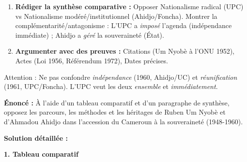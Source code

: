 \documentclass[11pt]{article}
\newcommand{\cle}[1]{{\popxbold\color{popdark}#1}}
\begin{document}
\begin{methode}
\begin{enumerate}
    \item \textbf{Rédiger la synthèse comparative :} Opposer \cle{Nationalisme radical (UPC)} vs \cle{Nationalisme modéré/institutionnel (Ahidjo/Foncha)}. Montrer la complémentarité/antagonisme : L'UPC a \emph{imposé} l'agenda (indépendance immédiate) ; Ahidjo a \emph{géré} la souveraineté (État).
    \item \textbf{Argumenter avec des preuves :} Citations (Um Nyobè à l'ONU 1952), Actes (Loi 1956, Référendum 1972), Dates précises.
\end{enumerate}
\cle{Attention :} Ne pas confondre \textit{indépendance} (1960, Ahidjo/UC) et \textit{réunification} (1961, UPC/Foncha). L'UPC veut les deux \emph{ensemble} et \emph{immédiatement}.
\end{methode}

\begin{exoresolu}
\textbf{Énoncé :} À l'aide d'un tableau comparatif et d'un paragraphe de synthèse, opposez les parcours, les méthodes et les héritages de Ruben Um Nyobè et d'Ahmadou Ahidjo dans l'accession du Cameroun à la souveraineté (1948-1960).

\tcblower
\textbf{Solution détaillée :}

\textbf{1. Tableau comparatif}


\end{exoresolu}
\end{document}
